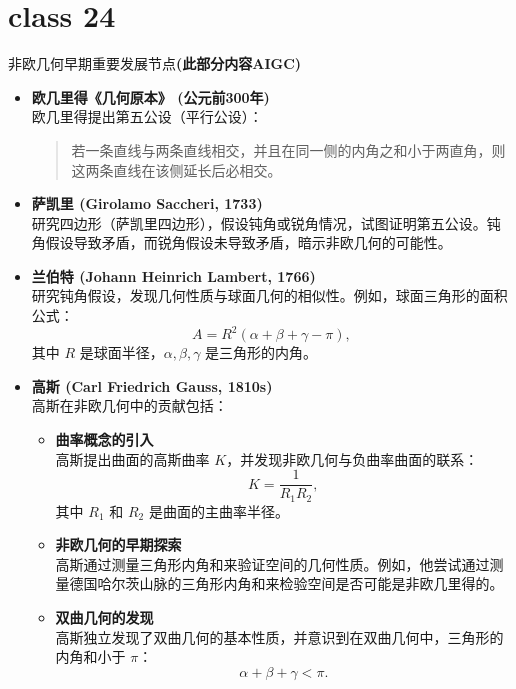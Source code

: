 \documentclass[12pt, a4paper, oneside, UTF8]{ctexbook}  %
\begin{document}
\section{class 24}
\begin{add}
    非欧几何早期重要发展节点\textbf{(此部分内容AIGC)}
    
    \begin{itemize}
        \item \textbf{欧几里得《几何原本》 (公元前300年)} \\
        欧几里得提出第五公设（平行公设）：
        \begin{quote}
            若一条直线与两条直线相交，并且在同一侧的内角之和小于两直角，则这两条直线在该侧延长后必相交。
        \end{quote}
    
        \item \textbf{萨凯里 (Girolamo Saccheri, 1733)} \\
        研究四边形（萨凯里四边形），假设钝角或锐角情况，试图证明第五公设。钝角假设导致矛盾，而锐角假设未导致矛盾，暗示非欧几何的可能性。
    
        \item \textbf{兰伯特 (Johann Heinrich Lambert, 1766)} \\
        研究钝角假设，发现几何性质与球面几何的相似性。例如，球面三角形的面积公式：
        \[
        A = R^2 (\alpha + \beta + \gamma - \pi),
        \]
        其中 \( R \) 是球面半径，\( \alpha, \beta, \gamma \) 是三角形的内角。
    
        \item \textbf{高斯 (Carl Friedrich Gauss, 1810s)} \\
        高斯在非欧几何中的贡献包括：
        \begin{itemize}
            \item \textbf{曲率概念的引入} \\
            高斯提出曲面的高斯曲率 \( K \)，并发现非欧几何与负曲率曲面的联系：
            \[
            K = \frac{1}{R_1 R_2},
            \]
            其中 \( R_1 \) 和 \( R_2 \) 是曲面的主曲率半径。
    
            \item \textbf{非欧几何的早期探索} \\
            高斯通过测量三角形内角和来验证空间的几何性质。例如，他尝试通过测量德国哈尔茨山脉的三角形内角和来检验空间是否可能是非欧几里得的。
    
            \item \textbf{双曲几何的发现} \\
            高斯独立发现了双曲几何的基本性质，并意识到在双曲几何中，三角形的内角和小于 \( \pi \)：
            \[
            \alpha + \beta + \gamma < \pi.
            \]
    

\end{itemize}
\end{itemize}
\end{add}
\end{document}
